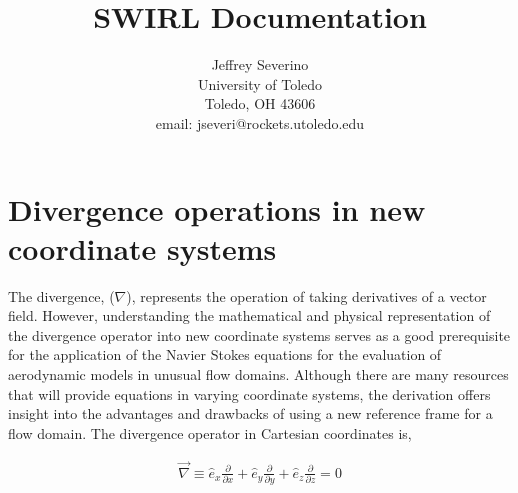 \documentclass[12pt]{article}
\begin{document}
\begin{titlepage}
\title{
SWIRL Documentation}


\author{ Jeffrey Severino
 \\
University of Toledo \\
Toledo, OH  43606 \\
email: jseveri@rockets.utoledo.edu  }

\maketitle

\end{titlepage}
\tableofcontents
\newpage
\section{Divergence operations in new coordinate systems}


The divergence, ($\nabla$), represents the operation of taking derivatives of a vector field. However, understanding the mathematical and physical representation of the divergence operator into new coordinate systems serves as a good prerequisite for the application of the Navier Stokes equations for the evaluation of aerodynamic models in unusual flow domains. Although there are many resources that will provide equations in varying coordinate systems, the derivation offers insight into the advantages and drawbacks of using a new reference frame for a flow domain. The divergence operator in Cartesian coordinates is,



\begin{align*}
\vec{\nabla} \equiv
\hat{e}_x \frac{\partial }{\partial x}  %
+ \hat{e}_y \frac{\partial }{\partial y}  %
	+ \hat{e}_z \frac{\partial }{\partial z}                      = 0
\label{Divergence_Operator}
\end{align*}
\end{document}
